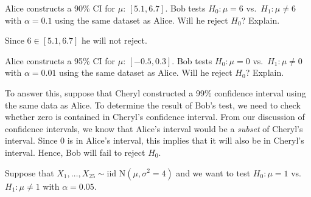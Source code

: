 \documentclass[addpoints,12pt]{exam}
\begin{document}
\begin{questions}


\question Alice constructs a 90\% CI for $\mu$: $[5.1, 6.7]$. Bob tests $H_0\colon \mu = 6$ vs.\ $H_1\colon \mu\neq 6$ with $\alpha = 0.1$ using the same dataset as Alice. Will he reject $H_0$? Explain.
\begin{solution}
  Since $6 \in [5.1, 6.7]$ he will not reject.
\end{solution}

\question Alice constructs a 95\% CI for $\mu$: $[-0.5, 0.3]$. Bob tests $H_0\colon \mu = 0$ vs.\ $H_1\colon \mu\neq 0$ with $\alpha = 0.01$ using the same dataset as Alice. Will he reject $H_0$? Explain.
\begin{solution}
  To answer this, suppose that Cheryl constructed a 99\% confidence interval using the same data as Alice.
  To determine the result of Bob's test, we need to check whether zero is contained in Cheryl's confidence interval.
  From our discussion of confidence intervals, we know that Alice's interval would be a \emph{subset} of Cheryl's interval.
  Since $0$ is in Alice's interval, this implies that it will also be in Cheryl's interval. 
  Hence, Bob will fail to reject $H_0$.
\end{solution}

\question Suppose that $X_1, \dots, X_{25} \sim \text{iid N}(\mu, \sigma^2 = 4)$ and we want to test $H_0\colon \mu = 1$ vs.\ $H_1\colon \mu \neq 1$ with $\alpha = 0.05$.
\end{questions}
\end{document}
